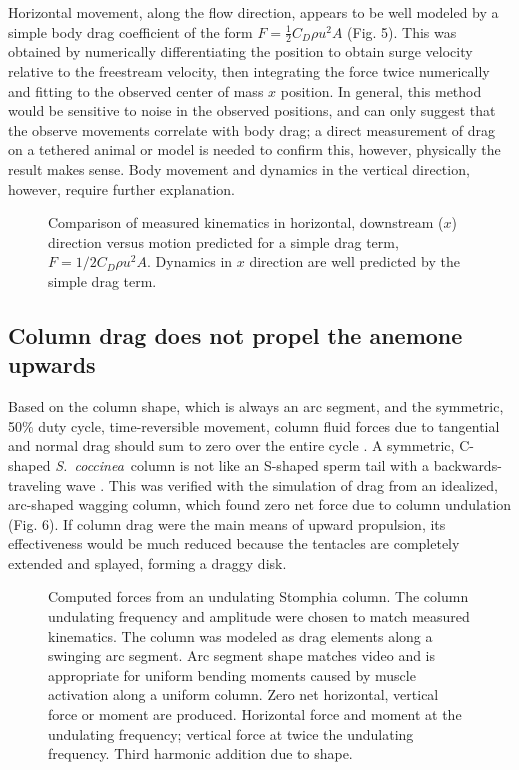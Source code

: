 \documentclass[10pt]{article}
\newcommand{\Genus}[1]{\emph{#1}}
\newcommand{\Stomphia}{\Genus{S.~coccinea}}
\begin{document}
Horizontal movement, along the flow direction, appears to be well modeled by a simple body drag coefficient of the form $F=\frac{1}{2} C_D \rho u^2 A$ (Fig. 5). This was obtained by numerically differentiating the position to obtain surge velocity relative to the freestream velocity, then integrating the force twice numerically and fitting to the observed center of mass $x$ position.  In general, this method would be sensitive to noise in the observed positions, and can only suggest that the observe movements correlate with body drag; a direct measurement of drag on a tethered animal or model is needed to confirm this, however, physically the result makes sense.  Body movement and dynamics in the vertical direction, however, require further explanation. 

\begin{figure}
\caption{Comparison of measured kinematics in horizontal, downstream ($x$) direction versus motion predicted for a simple drag term, $F=1/2C_D\rho u^2 A$.  Dynamics in $x$ direction are well predicted by the simple drag term.}
\label{fig:5}
\end{figure}

\subsection*{Column drag does not propel the anemone upwards}
	Based on the column shape, which is always an arc segment, and the symmetric, 50\% duty cycle, time-reversible movement, column fluid forces due to tangential and normal drag should sum to zero over the entire cycle \citep{Purcell:1977}.  A symmetric, C-shaped \Stomphia\ column is not like an S-shaped sperm tail with a backwards-traveling wave \citep{Gray:1955}.  This was verified with the simulation of drag from an idealized, arc-shaped wagging column, which found zero net force due to column undulation (Fig. 6).    If column drag were the main means of upward propulsion, its effectiveness would be much reduced because the tentacles are completely extended and splayed, forming a draggy disk.    

\begin{figure}
\caption{Computed forces from an undulating Stomphia column.  The column undulating frequency and 
amplitude were chosen to match measured kinematics.  The column was modeled as drag elements 
along a swinging arc segment.  Arc segment shape matches video and is appropriate for uniform bending moments caused by muscle activation along a uniform column.  Zero net horizontal, vertical force or moment are produced.  Horizontal force and moment at the undulating frequency; vertical force at twice the undulating frequency.  Third harmonic addition due to shape.}
\label{fig:6}
\end{figure}
\end{document}
